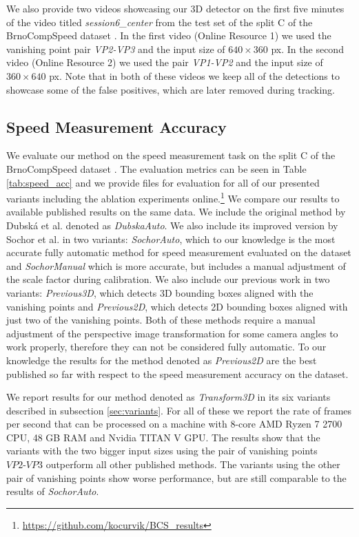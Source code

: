 \documentclass[twocolumn]{svjour3}          \smartqed  \usepackage{graphicx}
\begin{document}
We also provide two videos showcasing our 3D detector on the first five minutes of the video titled \textit{session6\_center} from the test set of the split C of the BrnoCompSpeed dataset \cite{brnocompspeed}. In the first video (Online Resource 1) we used the vanishing point pair \textit{VP2-VP3} and the input size of $640 \times 360$ px. In the second video (Online Resource 2) we used the pair \textit{VP1-VP2} and the input size of $360 \times 640$ px. Note that in both of these videos we keep all of the detections to showcase some of the false positives, which are later removed during tracking.

\subsection{Speed Measurement Accuracy}

We evaluate our method on the speed measurement task on the split C of the BrnoCompSpeed dataset \cite{brnocompspeed}. The evaluation metrics can be seen in Table \ref{tab:speed_acc} and we provide files for evaluation for all of our presented variants including the ablation experiments online.\footnote{\url{https://github.com/kocurvik/BCS_results}} We compare our results to available published results on the same data. We include the original method by Dubsk\'{a} et al. \cite{dubska2014} denoted as \textit{DubskaAuto}. We also include its improved version by Sochor et al. \cite{sochor2017} in two variants: \textit{SochorAuto}, which to our knowledge is the most accurate fully automatic method for speed measurement evaluated on the dataset and \textit{SochorManual} which is more accurate, but includes a manual adjustment of the scale factor during calibration. We also include our previous work \cite{CVWW2019} in two variants: \textit{Previous3D}, which detects 3D bounding boxes aligned with the vanishing points and \textit{Previous2D}, which detects 2D bounding boxes aligned with just two of the vanishing points. Both of these methods require a manual adjustment of the perspective image transformation for some camera angles to work properly, therefore they can not be considered fully automatic. To our knowledge the results for the method denoted as \textit{Previous2D} are the best published so far with respect to the speed measurement accuracy on the dataset.

We report results for our method denoted as \textit{Transform3D} in its six variants described in subsection \ref{sec:variants}. For all of these we report the rate of frames per second that can be processed on a machine with 8-core AMD Ryzen 7 2700 CPU, 48 GB RAM and Nvidia TITAN V GPU. The results show that the variants with the two bigger input sizes using the pair of vanishing points $\textit{VP2-VP3}$ outperform all other published methods. The variants using the other pair of vanishing points show worse performance, but are still comparable to the results of \textit{SochorAuto}.
\end{document}
